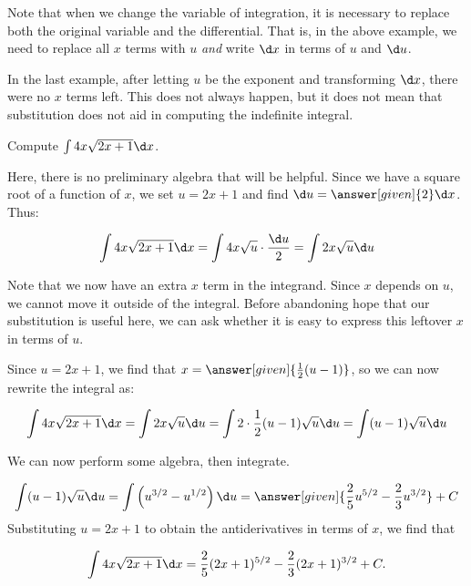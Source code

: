 \documentclass[nooutcomes]{ximera}
\begin{document}
\begin{remark}
Note that when we change the variable of integration, it is necessary to replace both the original variable and the differential.  That is, in the above example, we need to replace all $x$ terms with $u$ \emph{and} write $\d x$ in terms of $u$ and $\d u$. 
\end{remark}

In the last example, after letting $u$ be the exponent and transforming $\d x$, there were no $x$ terms left.  This does not always happen, but it does not mean that substitution does not aid in computing the indefinite integral.

\begin{example}
Compute $\int 4x \sqrt{2x+1} \d x$.

\begin{explanation}
Here, there is no preliminary algebra that will be helpful.  Since we have a square root of a function of $x$, we set $u=2x+1$ and find $\d u = \answer[given]{2} \d x$.  Thus:

\[
\int 4x \sqrt{2x+1} \d x = \int 4x \sqrt{u} \cdot  \frac{\d u}{2} =  \int 2x \sqrt{u} \d u
\]

Note that we now have an extra $x$ term in the integrand.  Since $x$ depends on $u$, we cannot move it outside of the integral.  Before abandoning hope that our substitution is useful here, we can ask whether it is easy to express this leftover $x$ in terms of $u$.  

Since $u= 2x+1$, we find that $x = \answer[given]{\frac{1}{2}(u-1)}$, so we can now rewrite the integral as:

\[
\int 4x \sqrt{2x+1} \d x =  \int 2x \sqrt{u} \d u = \int 2 \cdot \frac{1}{2}(u-1) \sqrt{u} \d u = \int (u-1)\sqrt{u} \d u
\]

We can now perform some algebra, then integrate.

\[
 \int (u-1)\sqrt{u} \d u = \int \left(u^{3/2} - u^{1/2} \right) \d u = \answer[given]{\frac{2}{5} u^{5/2} - \frac{2}{3} u^{3/2}} +C
\]
Substituting $u=2x+1$ to obtain the antiderivatives in terms of $x$, we find that

\[
\int 4x \sqrt{2x+1} \d x =  \frac{2}{5} (2x+1)^{5/2} - \frac{2}{3} (2x+1)^{3/2} +C.
\]
\end{explanation}
\end{example}
\end{document}
